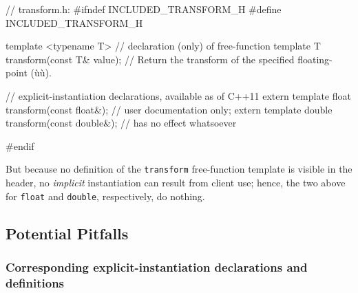 \begin{emcppslisting}
// transform.h:
#ifndef INCLUDED_TRANSFORM_H
#define INCLUDED_TRANSFORM_H

template <typename T>  // declaration (only) of free-function template
T transform(const T& value);
    // Return the transform of the specified floating-point (ù{}ù).

// explicit-instantiation declarations, available as of C++11
extern template float transform(const float&);    // user documentation only;
extern template double transform(const double&);  // has no effect whatsoever

#endif
\end{emcppslisting}

\noindent But because no definition of the \lstinline!transform! free-function
template is visible in the header, no \emph{implicit} instantiation can
result from client use; hence, the two  above for \lstinline!float! and \lstinline!double!,
respectively, do nothing.

\subsection[Potential Pitfalls]{Potential Pitfalls}\label{potential-pitfalls-externtemplate}

\subsubsection[Corresponding explicit-instantiation declarations and definitions]{Corresponding explicit-instantiation declarations and definitions}\label{corresponding-explicit-instantiation-declarations-and-definitions}

